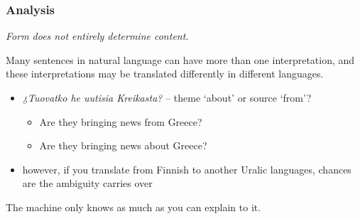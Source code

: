 \documentclass{beamer}
\begin{document}
\begin{frame}
  \frametitle{Analysis}

\begin{center}
{\em Form does not entirely determine content.}
\end{center}
Many sentences in natural language can have more than one interpretation, and these 
interpretations may be translated differently in different languages.

\begin{itemize}
  \item {\em ¿Tuovatko he uutisia Kreikasta?} -- {\sc theme} `about' or {\sc source} `from'?
  \begin{itemize}
    \item Are they bringing news from Greece?
    \item Are they bringing news about Greece?
  \end{itemize}
  \item however, if you translate from Finnish to another Uralic  languages,
      chances are the ambiguity carries over
\end{itemize}

The machine only knows as much as you can explain to it.

\end{frame}
\end{document}
